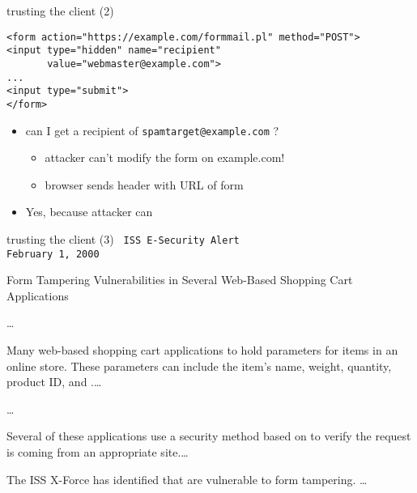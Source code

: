 \begin{frame}[fragile,label=trustCli2]{trusting the client (2)}
\begin{verbatim}
<form action="https://example.com/formmail.pl" method="POST">
<input type="hidden" name="recipient"
       value="webmaster@example.com">
...
<input type="submit">
</form>
\end{verbatim}
    \begin{itemize}
    \item can I get a recipient of \texttt{spamtarget@example.com} ?
        \begin{itemize}
        \item attacker can't modify the form on example.com!
        \item browser sends header with URL of form
        \end{itemize}
    \item<2> Yes, because attacker can 
    \end{itemize}
\end{frame}

\begin{frame}[fragile,label=trustCliNoOne]{trusting the client (3)}
\setlength{\parskip}{0em}
\fontsize{10}{11}\selectfont\tt
ISS E-Security Alert  \\
February 1, 2000 

Form Tampering Vulnerabilities in Several Web-Based Shopping Cart Applications

\ldots

Many web-based shopping cart applications  to
hold parameters for items in an online store. These parameters can include
the item's name, weight, quantity, product ID, and .\ldots

\ldots

Several of these applications use a security method based on 
to verify the request is coming from an appropriate site.\ldots

The ISS X-Force has identified  that are vulnerable to form tampering. \ldots

~
\end{frame}
